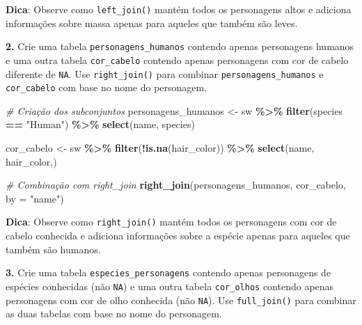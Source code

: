 \documentclass[
]{book}
\newenvironment{Shaded}{\begin{snugshade}}{\end{snugshade}}
\newcommand{\AttributeTok}[1]{\textcolor[rgb]{0.13,0.29,0.53}{#1}}
\newcommand{\CommentTok}[1]{\textcolor[rgb]{0.56,0.35,0.01}{\textit{#1}}}
\newcommand{\FunctionTok}[1]{\textcolor[rgb]{0.13,0.29,0.53}{\textbf{#1}}}
\newcommand{\NormalTok}[1]{#1}
\newcommand{\OtherTok}[1]{\textcolor[rgb]{0.56,0.35,0.01}{#1}}
\newcommand{\SpecialCharTok}[1]{\textcolor[rgb]{0.81,0.36,0.00}{\textbf{#1}}}
\newcommand{\StringTok}[1]{\textcolor[rgb]{0.31,0.60,0.02}{#1}}
\begin{document}
\textbf{Dica}: Observe como \texttt{left\_join()} mantém todos os personagens altos e
adiciona informações sobre massa apenas para aqueles que também são
leves.

\textbf{2.} Crie uma tabela \texttt{personagens\_humanos} contendo apenas personagens
humanos e uma outra tabela \texttt{cor\_cabelo} contendo apenas personagens com
cor de cabelo diferente de \texttt{NA}. Use \texttt{right\_join()} para combinar
\texttt{personagens\_humanos} e \texttt{cor\_cabelo} com base no nome do personagem.

\begin{Shaded}
\begin{Highlighting}[]
\CommentTok{\# Criação dos subconjuntos}
\NormalTok{personagens\_humanos }\OtherTok{\textless{}{-}}\NormalTok{ sw }\SpecialCharTok{\%\textgreater{}\%} 
  \FunctionTok{filter}\NormalTok{(species }\SpecialCharTok{==} \StringTok{"Human"}\NormalTok{) }\SpecialCharTok{\%\textgreater{}\%} 
  \FunctionTok{select}\NormalTok{(name, species)}

\NormalTok{cor\_cabelo }\OtherTok{\textless{}{-}}\NormalTok{ sw }\SpecialCharTok{\%\textgreater{}\%} 
  \FunctionTok{filter}\NormalTok{(}\SpecialCharTok{!}\FunctionTok{is.na}\NormalTok{(hair\_color)) }\SpecialCharTok{\%\textgreater{}\%} 
  \FunctionTok{select}\NormalTok{(name, hair\_color,)}

\CommentTok{\# Combinação com right\_join}
\FunctionTok{right\_join}\NormalTok{(personagens\_humanos, cor\_cabelo, }\AttributeTok{by =} \StringTok{"name"}\NormalTok{)}
\end{Highlighting}
\end{Shaded}

\textbf{Dica}: Observe como \texttt{right\_join()} mantém todos os personagens com
cor de cabelo conhecida e adiciona informações sobre a espécie apenas
para aqueles que também são humanos.

\textbf{3.} Crie uma tabela \texttt{especies\_personagens} contendo apenas
personagens de espécies conhecidas (não \texttt{NA}) e uma outra tabela
\texttt{cor\_olhos} contendo apenas personagens com cor de olho conhecida (não
\texttt{NA}). Use \texttt{full\_join()} para combinar as duas tabelas com base no nome
do personagem.
\end{document}
